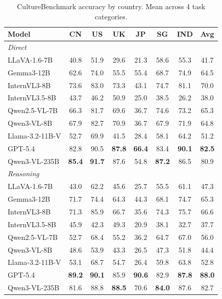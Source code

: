 \begin{table}[t]
\centering
\small
\caption{CultureBenchmark accuracy by country. Mean across 4 task categories.}
\label{tab:results_by_country}
\begin{tabular}{lccccccc}
\toprule
Model & CN & US & UK & JP & SG & IND & Avg \\
\midrule
\multicolumn{8}{l}{\textit{Direct}} \\
LLaVA-1.6-7B & 40.8 & 51.9 & 29.6 & 21.3 & 58.6 & 55.3 & 41.7 \\
Gemma3-12B & 62.6 & 74.0 & 55.5 & 55.4 & 68.7 & 74.9 & 64.5 \\
InternVL3-8B & 73.6 & 83.0 & 73.3 & 43.1 & 74.7 & 81.1 & 70.0 \\
InternVL3.5-8B & 43.7 & 46.2 & 50.9 & 25.0 & 38.5 & 26.2 & 38.0 \\
Qwen2.5-VL-7B & 66.3 & 81.7 & 69.6 & 36.7 & 74.6 & 73.2 & 65.3 \\
Qwen3-VL-8B & 67.9 & 82.7 & 70.9 & 36.7 & 67.9 & 71.9 & 64.8 \\
Llama-3.2-11B-V & 52.7 & 69.9 & 41.5 & 28.4 & 58.1 & 64.2 & 51.2 \\
GPT-5.4 & 82.8 & 90.5 & \textbf{87.8} & \textbf{66.4} & 83.4 & \textbf{90.1} & \textbf{82.5} \\
Qwen3-VL-235B & \textbf{85.4} & \textbf{91.7} & 87.6 & 54.8 & \textbf{87.2} & 86.5 & 80.9 \\
\midrule
\multicolumn{8}{l}{\textit{Reasoning}} \\
LLaVA-1.6-7B & 43.0 & 62.2 & 45.6 & 25.7 & 55.5 & 61.1 & 47.3 \\
Gemma3-12B & 71.7 & 74.4 & 64.3 & 44.3 & 68.1 & 74.7 & 65.3 \\
InternVL3-8B & 71.3 & 85.9 & 66.7 & 35.6 & 74.3 & 75.7 & 66.6 \\
InternVL3.5-8B & 45.9 & 42.3 & 49.3 & 20.9 & 38.1 & 32.7 & 37.7 \\
Qwen2.5-VL-7B & 52.7 & 68.4 & 55.2 & 36.2 & 64.7 & 67.0 & 56.0 \\
Qwen3-VL-8B & 48.6 & 53.9 & 43.3 & 26.5 & 47.3 & 51.8 & 44.4 \\
Llama-3.2-11B-V & 53.1 & 68.7 & 54.7 & 26.4 & 59.8 & 63.8 & 52.8 \\
GPT-5.4 & \textbf{89.2} & \textbf{90.1} & 85.9 & \textbf{90.6} & 82.9 & \textbf{87.8} & \textbf{88.0} \\
Qwen3-VL-235B & 81.6 & 88.8 & \textbf{88.5} & 70.6 & \textbf{84.0} & 87.6 & 82.7 \\
\midrule

\end{tabular}
\end{table}
